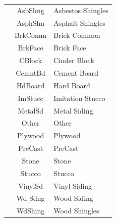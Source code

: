 \documentclass[11pt]{scrartcl} %
\begin{document}
\begin{center}
\begin{tabular}{c c c c c c}
\multicolumn{2}{|c}{} & \multicolumn{1}{c}{AsbShng} & \multicolumn{3}{l|}{Asbestos Shingles}\\
\multicolumn{2}{|c}{} & \multicolumn{1}{c}{AsphShn} & \multicolumn{3}{l|}{Asphalt Shingles}\\
\multicolumn{2}{|c}{} & \multicolumn{1}{c}{BrkComm} & \multicolumn{3}{l|}{Brick Common}\\
\multicolumn{2}{|c}{} & \multicolumn{1}{c}{BrkFace} & \multicolumn{3}{l|}{Brick Face}\\
\multicolumn{2}{|c}{} & \multicolumn{1}{c}{CBlock} & \multicolumn{3}{l|}{Cinder Block}\\
\multicolumn{2}{|c}{} & \multicolumn{1}{c}{CemntBd} & \multicolumn{3}{l|}{Cement Board}\\
\multicolumn{2}{|c}{} & \multicolumn{1}{c}{HdBoard} & \multicolumn{3}{l|}{Hard Board}\\
\multicolumn{2}{|c}{} & \multicolumn{1}{c}{ImStucc} & \multicolumn{3}{l|}{Imitation Stucco}\\
\multicolumn{2}{|c}{} & \multicolumn{1}{c}{MetalSd} & \multicolumn{3}{l|}{Metal Siding}\\
\multicolumn{2}{|c}{} & \multicolumn{1}{c}{Other} & \multicolumn{3}{l|}{Other}\\
\multicolumn{2}{|c}{} & \multicolumn{1}{c}{Plywood} & \multicolumn{3}{l|}{Plywood}\\
\multicolumn{2}{|c}{} & \multicolumn{1}{c}{PreCast} & \multicolumn{3}{l|}{PreCast}\\
\multicolumn{2}{|c}{} & \multicolumn{1}{c}{Stone	} & \multicolumn{3}{l|}{Stone}\\
\multicolumn{2}{|c}{} & \multicolumn{1}{c}{Stucco} & \multicolumn{3}{l|}{Stucco}\\
\multicolumn{2}{|c}{} & \multicolumn{1}{c}{VinylSd} & \multicolumn{3}{l|}{Vinyl Siding}\\
\multicolumn{2}{|c}{} & \multicolumn{1}{c}{Wd Sdng} & \multicolumn{3}{l|}{Wood Siding}\\
\multicolumn{2}{|c}{} & \multicolumn{1}{c}{WdShing} & \multicolumn{3}{l|}{Wood Shingles}\\
\hline
\end{tabular}
\end{center}
\end{document}
